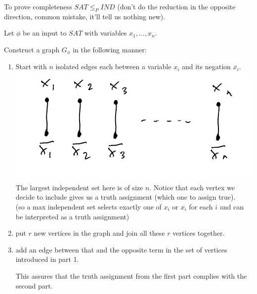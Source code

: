 \documentclass[12 pt]{article}
\begin{document}
          To prove completeness $SAT \leq_P IND$ (don't do the
          reduction in the opposite direction, common mistake, it'll
          tell us nothing new).

          Let $\phi$ be an input to $SAT$ with variables $x_1, \ldots,
          x_n$.

          Construct a graph $G_{\phi}$ in the following manner:
          \begin{enumerate}
          \item Start with $n$ isolated edges each between a variable
            $x_i$ and its negation $\overline{x_i}$.
            \\ \includegraphics[width=.9\textwidth]{i126.pdf}
            \\ The largest independent set here is of size $n$. Notice
            that each vertex we decide to include gives us a truth
            assignment (which one to assign true).
            \\ (so a max independent set selects exactly one of $x_i$
            or $\overline{x_i}$ for each $i$ and can be interpreted as
            a truth assignment)
          \item
            \begin{algorithmic}
                \State put $r$ new vertices in the graph and join all
                these $r$ vertices together.
              \EndFor
            \end{algorithmic}
          \item
            \begin{algorithmic}
                \State add an edge between that and the opposite term
                in the set of vertices introduced in part 1.
              \EndFor
            \end{algorithmic}
            This assures that the truth assignment from the first part
            complies with the second part.
          \end{enumerate}
\end{document}
